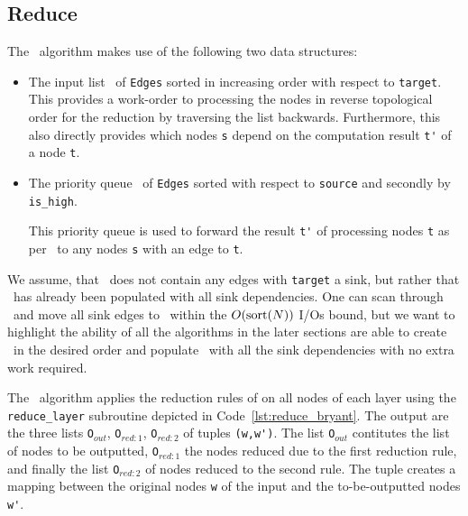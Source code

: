 \subsection{Reduce} \label{sec:theory__reduce}
The \Reduce\ algorithm makes use of the following two data structures:

\begin{itemize}
\item The input list \ReduceLforward\ of \lstinline{Edges} sorted in increasing
  order with respect to \lstinline{target}. This provides a work-order to
  processing the nodes in reverse topological order for the reduction by
  traversing the list backwards. Furthermore, this also directly provides which
  nodes \lstinline{s} depend on the computation result \lstinline{t'} of a node
  \lstinline{t}.

\item The priority queue \ReduceQdep\ of \lstinline{Edges} sorted with
  respect to \lstinline{source} and secondly by \lstinline{is_high}.

  This priority queue is used to forward the result \lstinline{t'} of processing
  nodes \lstinline{t} as per \ReduceLforward\ to any nodes \lstinline{s} with an
  edge to \lstinline{t}.
\end{itemize}
We assume, that \ReduceLforward\ does not contain any edges with
\lstinline{target} a sink, but rather that \ReduceQdep\ has already been
populated with all sink dependencies. One can scan through \ReduceLforward\ and
move all sink edges to \ReduceQdep\ within the $O(\text{sort}(N))$ I/Os bound, but we
want to highlight the ability of all the algorithms in the later sections are
able to create \ReduceLforward\ in the desired order and populate \ReduceQdep\
with all the sink dependencies with no extra work required.

The \Reduce\ algorithm applies the reduction rules of \textcite[Definition
5]{Bryant86} on all nodes of each layer using the \lstinline{reduce_layer}
subroutine depicted in Code~\ref{lst:reduce_bryant}. The output are the three
lists \lstinline{O}$_{\mathit{out}}$, \lstinline{O}$_{\mathit{red:}1}$,
\lstinline{O}$_{\mathit{red:}2}$ of tuples \lstinline{(w,w')}. The list
\lstinline{O}$_{\mathit{out}}$ contitutes the list of nodes to be outputted,
\lstinline{O}$_{\mathit{red:}1}$ the nodes reduced due to the first reduction
rule, and finally the list \lstinline{O}$_{\mathit{red:}2}$ of nodes reduced to
the second rule. The tuple creates a mapping between the original nodes
\lstinline{w} of the input and the to-be-outputted nodes \lstinline{w'}.

